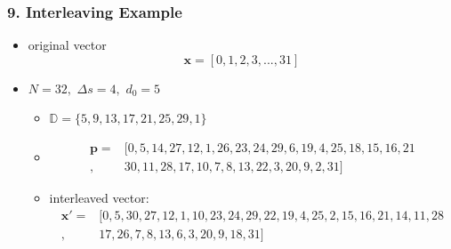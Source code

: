 \documentclass{beamer}  %
\begin{document}
\begin{frame}
\frametitle{9. Interleaving Example}
\begin{example}
\begin{itemize}

\item original vector $$\mathbf{x}=[0, 1, 2, 3,...,31]$$
\setlength\itemsep{2em}
\item $N=32, \,\, \Delta s =4, \,\, d_0=5$ 
\begin{itemize}
\item $\mathbb{D}=\{5, 9, 13, 17, 21, 25, 29, 1\}$

\item 
\begin{equation*}
\begin{split}
\mathbf{p}= &[ 0, 5, 14, 27, 12, 1, 26, 23, 24, 29, 6, 19, 4, 25, 18, 15, 16, 21\\,
 &30, 11, 28, 17, 10, 7, 8, 13, 22, 3, 20, 9, 2, 31]
\end{split}
\end{equation*}
 \item interleaved vector:
\begin{equation*}
\begin{split}
\mathbf{x}'=&[0,5,30,27,12,1,10,23,24,29,22,19, 4, 25 ,2, 15,16, 21, 14, 11, 28\\,&17,
  26, 7, 8, 13, 6, 3, 20, 9, 18, 31]
\end{split}
\end{equation*}
\end{itemize}



\end {itemize}
\end{example}
\end{frame}
\end{document}
